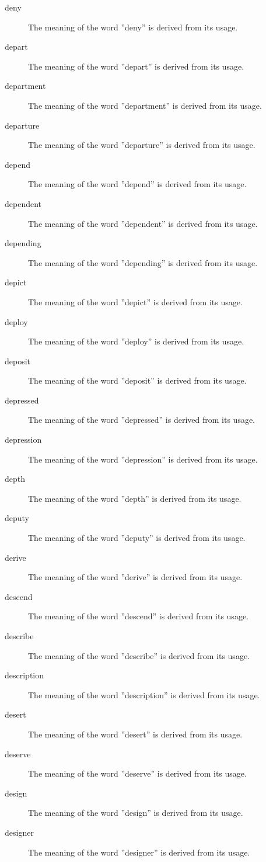 \documentclass[12pt, letterpaper]{memoir}
\begin{document}
\begin{description}
\item[deny] The meaning of the word ''deny'' is derived from its usage.
\item[depart] The meaning of the word ''depart'' is derived from its usage.
\item[department] The meaning of the word ''department'' is derived from its usage.
\item[departure] The meaning of the word ''departure'' is derived from its usage.
\item[depend] The meaning of the word ''depend'' is derived from its usage.
\item[dependent] The meaning of the word ''dependent'' is derived from its usage.
\item[depending] The meaning of the word ''depending'' is derived from its usage.
\item[depict] The meaning of the word ''depict'' is derived from its usage.
\item[deploy] The meaning of the word ''deploy'' is derived from its usage.
\item[deposit] The meaning of the word ''deposit'' is derived from its usage.
\item[depressed] The meaning of the word ''depressed'' is derived from its usage.
\item[depression] The meaning of the word ''depression'' is derived from its usage.
\item[depth] The meaning of the word ''depth'' is derived from its usage.
\item[deputy] The meaning of the word ''deputy'' is derived from its usage.
\item[derive] The meaning of the word ''derive'' is derived from its usage.
\item[descend] The meaning of the word ''descend'' is derived from its usage.
\item[describe] The meaning of the word ''describe'' is derived from its usage.
\item[description] The meaning of the word ''description'' is derived from its usage.
\item[desert] The meaning of the word ''desert'' is derived from its usage.
\item[deserve] The meaning of the word ''deserve'' is derived from its usage.
\item[design] The meaning of the word ''design'' is derived from its usage.
\item[designer] The meaning of the word ''designer'' is derived from its usage.

\end{description}
\end{document}
